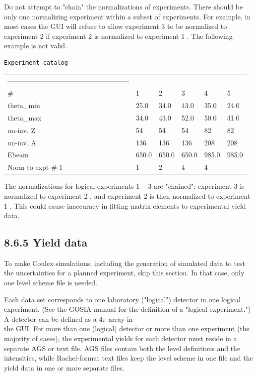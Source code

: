 \documentclass[10pt]{article}
\begin{document}
Do not attempt to "chain" the normalizations of experiments. There should be only one normalizing experiment within a subset of experiments. For example, in most cases the GUI will refuse to allow experiment 3 to be normalized to experiment 2 if experiment 2 is normalized to experiment 1 . The following example is not valid.

\begin{verbatim}
Experiment catalog
\end{verbatim}

\begin{center}
\begin{tabular}{llllll}
----------------------------------------------------- &  &  &  &  &  \\
\# & 1 & 2 & 3 & 4 & 5 \\
theta\_min & 25.0 & 34.0 & 43.0 & 35.0 & 24.0 \\
theta\_max & 34.0 & 43.0 & 52.0 & 50.0 & 31.0 \\
un-inv. Z & 54 & 54 & 54 & 82 & 82 \\
un-inv. A & 136 & 136 & 136 & 208 & 208 \\
Ebeam & 650.0 & 650.0 & 650.0 & 985.0 & 985.0 \\
Norm to expt \# 1 & 1 & 2 & 4 & 4 &  \\
\end{tabular}
\end{center}

The normalizations for logical experiments $1-3$ are "chained": experiment 3 is normalized to experiment 2 , and experiment 2 is then normalized to experiment 1 . This could cause inaccuracy in fitting matrix elements to experimental yield data.

\subsection*{8.6.5 Yield data}
To make Coulex simulations, including the generation of simulated data to test the uncertainties for a planned experiment, skip this section. In that case, only one level scheme file is needed.

Each data set corresponds to one laboratory ("logical") detector in one logical experiment. (See the GOSIA manual for the definition of a "logical experiment.") A detector can be defined as a $4 \pi$ array in\\
the GUI. For more than one (logical) detector or more than one experiment (the majority of cases), the experimental yields for each detector must reside in a separate AGS or text file. AGS files contain both the level definitions and the intensities, while Rachel-format text files keep the level scheme in one file and the yield data in one or more separate files.
\end{document}
